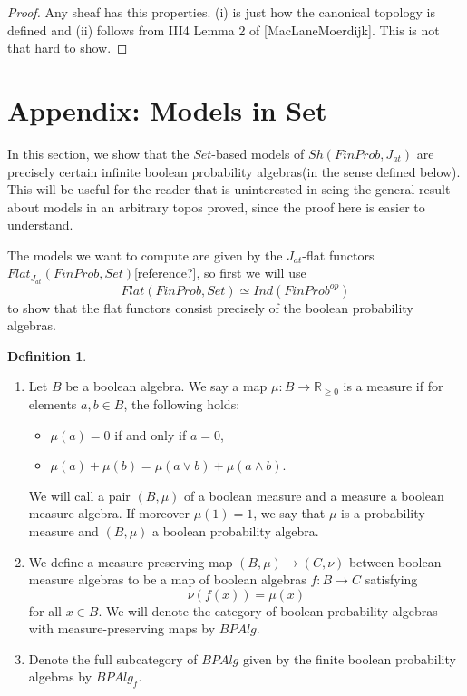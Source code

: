 \documentclass[a4paper]{amsproc}
\theoremstyle{plain}
\theoremstyle{definition}
\newtheorem{definition}[theorem]{Definition}
\theoremstyle{remark}
\numberwithin{equation}{section}
\begin{document}
\begin{proof} Any sheaf has this properties. (i) is just how the canonical topology is defined and (ii) follows from III4 Lemma 2 of [MacLaneMoerdijk]. This is not that hard to show.
\end{proof}


\section{Appendix: Models in Set}

In this section, we show that the $Set$-based models of $Sh(FinProb, J_{at})$ are precisely certain infinite boolean probability algebras(in the sense defined below). This will be useful for the reader that is uninterested in seing the general result about models in an arbitrary topos proved, since the proof here is easier to understand.

The models we want to compute are given by the $J_{at}$-flat functors $Flat_{J_{at}}(FinProb, Set)$[reference?], so first we will use 
\[
Flat(FinProb, Set) \simeq Ind(FinProb^{op})
\]
to show that the flat functors consist precisely of the boolean probability algebras.

\begin{definition}
\begin{enumerate}
\item Let $B$ be a boolean algebra. We say a map $\mu: B \to \mathbb{R}_{\geq 0}$ is a measure if for elements $a,b \in B$, the following holds:
\begin{itemize}
\item $\mu(a) = 0$ if and only if $a = 0 $,
\item $\mu(a) + \mu(b) = \mu(a \vee b) + \mu(a \wedge b)$.
\end{itemize}
We will call a pair $(B, \mu)$ of a boolean measure and a measure a boolean measure algebra. If moreover $\mu(1) = 1$, we say that $\mu$ is a  probability measure and $(B,\mu)$ a boolean probability algebra.
\item We define a measure-preserving map $(B, \mu) \to (C, \nu)$ between boolean measure algebras to be a map of boolean algebras $f: B \to C$ satisfying
\[
\nu(f(x)) = \mu(x)
\]
for all $x \in B$. We will denote the category of boolean probability algebras with measure-preserving maps by $BPAlg$.
\item Denote the full subcategory of $BPAlg$ given by the finite boolean probability algebras by $BPAlg_f$.
\end{enumerate}
\end{definition}
\end{document}

